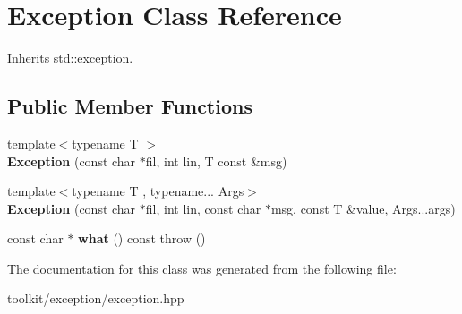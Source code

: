 \hypertarget{classException}{
\section{Exception Class Reference}
\label{classException}
}


Inherits std::exception.\subsection*{Public Member Functions}
\begin{DoxyCompactItemize}
\item 
\hypertarget{classException_aa97328466ae0d1854f5ac67c3ca3934c}{
{\footnotesize template$<$typename T $>$ }\\{\bfseries Exception} (const char $\ast$fil, int lin, T const \&msg)}
\label{classException_aa97328466ae0d1854f5ac67c3ca3934c}

\item 
\hypertarget{classException_a89a13132f47004f0bda5c6ef90a1ddec}{
{\footnotesize template$<$typename T , typename... Args$>$ }\\{\bfseries Exception} (const char $\ast$fil, int lin, const char $\ast$msg, const T \&value, Args...args)}
\label{classException_a89a13132f47004f0bda5c6ef90a1ddec}

\item 
\hypertarget{classException_a45642915395d3b813fedc2593fbcb8bb}{
const char $\ast$ {\bfseries what} () const   throw ()}
\label{classException_a45642915395d3b813fedc2593fbcb8bb}

\end{DoxyCompactItemize}


The documentation for this class was generated from the following file:\begin{DoxyCompactItemize}
\item 
toolkit/exception/exception.hpp\end{DoxyCompactItemize}
